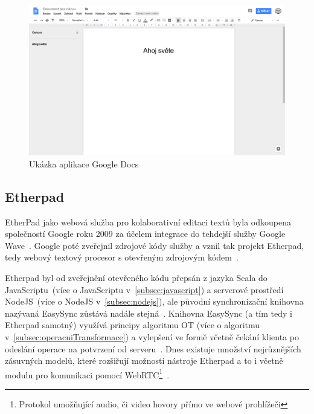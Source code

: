 \begin{figure}[ht]
    \centering
    \includegraphics[width=\textwidth]{partials/analyza/googleDocs}
    \caption{Ukázka aplikace Google Docs}\label{fig:googleDocs}
\end{figure}

\subsection{Etherpad}\label{subsec:etherpad}

EtherPad jako webová služba pro kolaborativní editaci textů byla odkoupena společností Google roku 2009 za účelem integrace do tehdejší služby Google Wave~\cite{etherpad:acquired}.
Google poté zveřejnil zdrojové kódy služby a vznil tak projekt Etherpad, tedy webový textový procesor s otevřeným zdrojovým kódem~\cite{etherpad:openSource}.

Etherpad byl od zveřejnění otevřeného kódu přepsán z jazyka Scala do JavaScriptu~(více o JavaScriptu v~\ref{subsec:javascript}) a serverové prostředí NodeJS~(více o NodeJS v~\ref{subsec:nodejs}), ale původní synchronizační knihovna nazývaná EasySync zůstává nadále stejná~\cite{etherpad:newgithub, etherpad:easySync}.
Knihovna EasySync (a tím tedy i Etherpad samotný) využívá principy algoritmu \gls{OT} (více o algoritmu v~\ref{subsec:operacniTransformace}) a vylepšení ve formě včetně čekání klienta po odeslání operace na potvrzení od serveru~\cite{etherpad:easySync}.
Dnes existuje množství nejrůznějších zásuvných modelů, které rozšiřují možnosti nástroje Etherpad a to i včetně modulu pro komunikaci pomocí WebRTC\footnote{Protokol umožňující audio, či video hovory přímo ve webové prohlížeči}~\cite{etherpad:plugins}.

